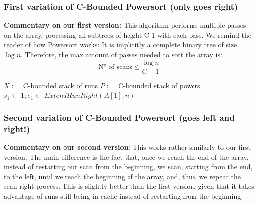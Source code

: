\documentclass{article}
\begin{document}
\subsubsection{\textbf{\textbf{First variation of C-Bounded Powersort (only goes right)}}}
\textbf{Commentary on our first version:} 
This algorithm performs multiple passes on the array, processing all subtrees
of height C-1 with each pass. We remind the reader of how Powersort works:
It is implicitly a complete binary tree of size $\log{n}$. Therefore, the max amount of passes
needed to sort the array is:
\begin{equation}
    \text{N° of scans} \leq {\frac{\log{n}}{{C-1}}}
\end{equation}
\begin{algorithm2e}[H]
\caption{First\_{}C-Bounded\_{}Powersort(A[1...n])}\label{ps2}
$X :=$ C-bounded stack of runs
$P :=$ C-bounded stack of powers
$s_1 \gets 1; e_1 \gets ExtendRunRight(A[1], n)$\;
\end{algorithm2e}
\newpage
\subsubsection{\textbf{\textbf{Second variation of C-Bounded Powersort (goes left and right!)}}}
\textbf{Commentary on our second version:} This works rather similarly to our first \linebreak 
version. The main difference is the fact that, once we reach the end of the array, instead of restarting
our scan from the beginning, we scan, starting from the end, to the left, until we reach the beginning of the array,
and, thus, we repeat the scan-right process.
This is slightly better than the first version, given that it takes advantage of 
runs still being in cache instead of restarting from the beginning. 
\end{document}
